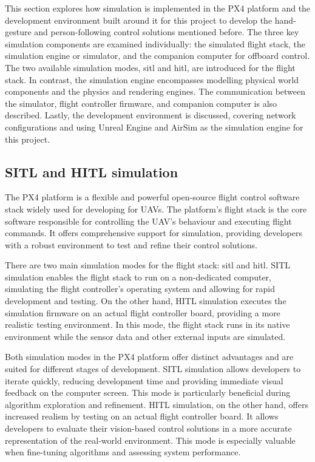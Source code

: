 This section explores how simulation is implemented in the PX4 platform and the development environment built around it for this project to develop the hand-gesture and person-following control solutions mentioned before.
The three key simulation components are examined individually: the simulated flight stack, the simulation engine or simulator, and the companion computer for offboard control. 
The two available simulation modes, \acrfull{sitl} and \acrfull{hitl}, are introduced for the flight stack. In contrast, the simulation engine encompasses modelling physical world components and the physics and rendering engines. 
The communication between the simulator, flight controller firmware, and companion computer is also described. 
Lastly, the development environment is discussed, covering network configurations and using Unreal Engine and AirSim as the simulation engine for this project.

\subsection{SITL and HITL simulation}

The PX4 platform is a flexible and powerful open-source flight control software stack widely used for developing for UAVs. The platform’s flight stack is the core software responsible for controlling the UAV's behaviour and executing flight commands. It offers comprehensive support for simulation, providing developers with a robust environment to test and refine their control solutions.

There are two main simulation modes for the flight stack: \acrfull{sitl} and \acrfull{hitl}. SITL simulation enables the flight stack to run on a non-dedicated computer, simulating the flight controller’s operating system and allowing for rapid development and testing. On the other hand, HITL simulation executes the simulation firmware on an actual flight controller board, providing a more realistic testing environment. In this mode, the flight stack runs in its native environment while the sensor data and other external inputs are simulated.

Both simulation modes in the PX4 platform offer distinct advantages and are suited for different stages of development. SITL simulation allows developers to iterate quickly, reducing development time and providing immediate visual feedback on the computer screen. This mode is particularly beneficial during algorithm exploration and refinement. HITL simulation, on the other hand, offers increased realism by testing on an actual flight controller board. It allows developers to evaluate their vision-based control solutions in a more accurate representation of the real-world environment. This mode is especially valuable when fine-tuning algorithms and assessing system performance.

